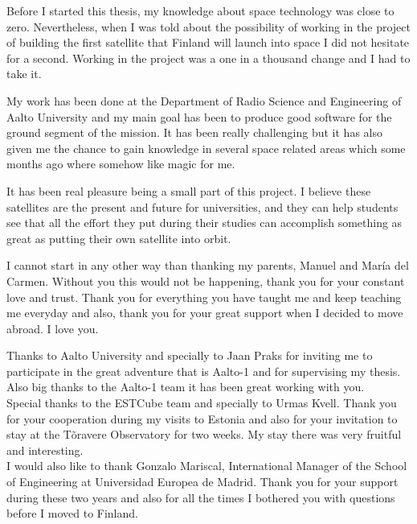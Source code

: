 
Before I started this thesis, my knowledge about space technology was close to zero. Nevertheless, when I was told about the possibility of working in the project of building the first satellite that Finland will launch into space I did not hesitate for a second. Working in the project was a one in a thousand change and I had to take it.

My work has been done at the Department of Radio Science and Engineering of Aalto University and my main goal has been to produce good software for the ground segment of the mission. It has been really challenging but it has also given me the chance to gain knowledge in several space related areas which some months ago where somehow like magic for me.

It has been real pleasure being a small part of this project. I believe these satellites are the present and future for universities, and they can help students see that all the effort they put during their studies can accomplish something as great as putting their own satellite into orbit.


\thispagestyle{plain}
\pagebreak


I cannot start in any other way than thanking my parents, Manuel and María del Carmen. Without you this would not be happening, thank you for your constant love and trust. Thank you for everything you have taught me and keep teaching me everyday and also, thank you for your great support when I decided to move abroad. I love you.

Thanks to Aalto University and specially to Jaan Praks for inviting me to participate in the great adventure that is Aalto-1 and for supervising my thesis. Also big thanks to the Aalto-1 team it has been great working with you.\\

Special thanks to the ESTCube team and specially to Urmas Kvell. Thank you for your cooperation during my visits to Estonia and also for your invitation to stay at the Tõravere Observatory for two weeks. My stay there was very fruitful  and interesting.\\

I would also like to thank Gonzalo Mariscal, International Manager of the School of Engineering at Universidad Europea de Madrid. Thank you for your support during these two years and also for all the times I bothered you with questions before I moved to Finland.\\

